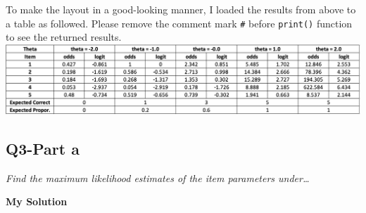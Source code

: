 \documentclass[
]{article}
\begin{document}
To make the layout in a good-looking manner, I loaded the results from
above to a table as followed. Please remove the comment mark \texttt{\#}
before \texttt{print()} function to see the returned results.\\
\includegraphics{table_1.png}

\hypertarget{q3-part-a}{%
\subsection{Q3-Part a}\label{q3-part-a}}

\emph{Find the maximum likelihood estimates of the item parameters
under\ldots{}}

\textbf{My Solution}
\end{document}
